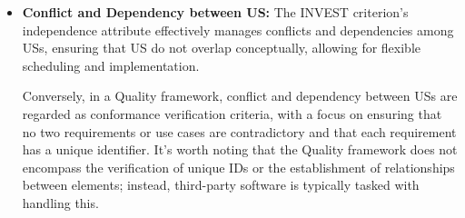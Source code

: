 \begin{itemize}
\item \textbf{Conflict and Dependency between US:} The INVEST criterion's independence attribute effectively manages conflicts and dependencies among USs, ensuring that US do not overlap conceptually, allowing for flexible scheduling and implementation. 

Conversely, in a Quality framework, conflict and dependency between USs are regarded as conformance verification criteria, with a focus on ensuring that no two requirements or use cases are contradictory and that each requirement has a unique identifier. It's worth noting that the Quality framework does not encompass the verification of unique IDs or the establishment of relationships between elements; instead, third-party software is typically tasked with handling this. 


\end{itemize}

